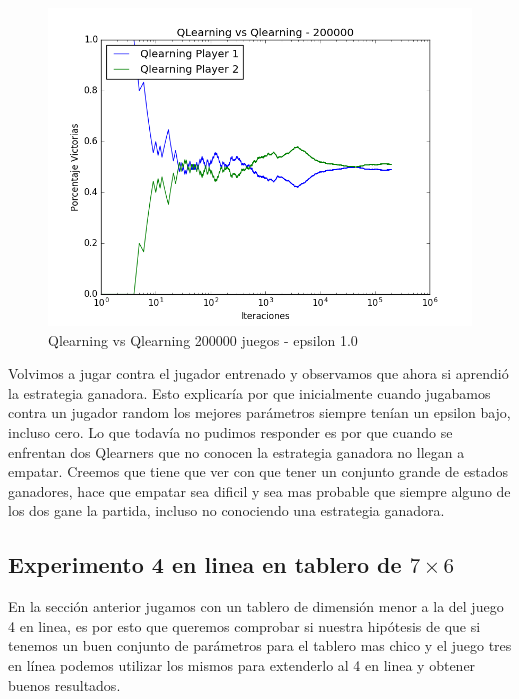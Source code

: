 \begin{figure}[H]
 \centering
 \begin{minipage}{.45\textwidth}
	\centering
	\includegraphics[scale=0.35]{img1/QlearningVsQlearning_200000_6x5_merge_e0p1.png}
        \caption{Qlearning vs Qlearning 200000 juegos - epsilon 1.0}
  \end{minipage}
\end{figure}


Volvimos a jugar contra el jugador entrenado y observamos que ahora si aprendió la estrategia ganadora. Esto explicaría por que inicialmente cuando jugabamos contra un jugador random los mejores parámetros siempre tenían un epsilon bajo, incluso cero.
Lo que todavía no pudimos responder es por que cuando se enfrentan dos Qlearners que no conocen la estrategia ganadora no llegan a empatar. Creemos que tiene que ver con que tener un conjunto grande de estados ganadores, hace que empatar sea dificil y sea mas probable que siempre alguno de los dos gane la partida, incluso no conociendo una estrategia ganadora.\\



\subsection{Experimento 4 en linea en tablero de $7\times6$}
En la sección anterior jugamos con un tablero de dimensión menor a la del juego 4 en linea, es por esto que queremos comprobar si nuestra hipótesis de que si tenemos un buen conjunto de parámetros para el tablero mas chico y el juego tres en línea podemos utilizar los mismos para extenderlo al 4 en linea y obtener buenos resultados.

